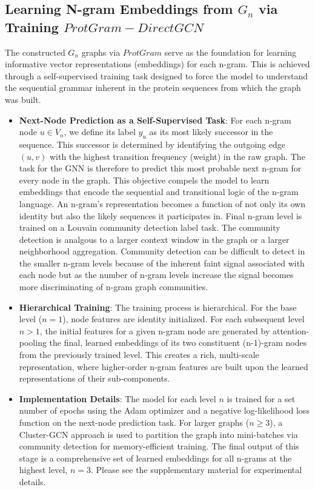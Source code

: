 \documentclass[utf8]{article}
\begin{document}
	\subsection{Learning N-gram Embeddings from $G_{n}$ via Training $ProtGram-DirectGCN$}
	The constructed $G_{n}$ graphs via $ProtGram$ serve as the foundation for learning informative vector representations (embeddings) for each n-gram. This is achieved through a self-supervised training task designed to force the model to understand the sequential grammar inherent in the protein sequences from which the graph was built.
	\begin{itemize}
		\item \textbf{Next-Node Prediction as a Self-Supervised Task}: For each n-gram node $u \in V_n$, we define its label $y_u$ as its most likely successor in the sequence. This successor is determined by identifying the outgoing edge $(u,v)$ with the highest transition frequency (weight) in the raw graph. The task for the GNN is therefore to predict this most probable next n-gram for every node in the graph. This objective compels the model to learn embeddings that encode the sequential and transitional logic of the n-gram language. An n-gram's representation becomes a function of not only its own identity but also the likely sequences it participates in. Final n-gram level is trained on a Louvain community detection \cite{blondel_fastunfoldingcommunities_2008} label task. The community detection is analgous to a larger context window in the graph or a larger neighborhood aggregation. Community detection can be difficult to detect in the smaller n-gram levels because of the inherent faint signal associated with each node but as the number of n-gram levels increase the signal becomes more discriminating of n-gram graph communities. 
		
		\item \textbf{Hierarchical Training}: The training process is hierarchical. For the base level ($n=1$), node features are identity initialized. For each subsequent level $n > 1$, the initial features for a given n-gram node are generated by attention-pooling the final, learned embeddings of its two constituent (n-1)-gram nodes from the previously trained level. This creates a rich, multi-scale representation, where higher-order n-gram features are built upon the learned representations of their sub-components.
		
		\item \textbf{Implementation Details}: The model for each level $n$ is trained for a set number of epochs using the Adam optimizer and a negative log-likelihood loss function on the next-node prediction task. For larger graphs ($n \geq 3$), a Cluster-GCN \cite{chiang_clustergcnefficientalgorithm_2019} approach is used to partition the graph into mini-batches via community detection for memory-efficient training. The final output of this stage is a comprehensive set of learned embeddings for all n-grams at the highest level, $n=3$. Please see the supplementary material for experimental details.
	\end{itemize}
	
\end{document}
